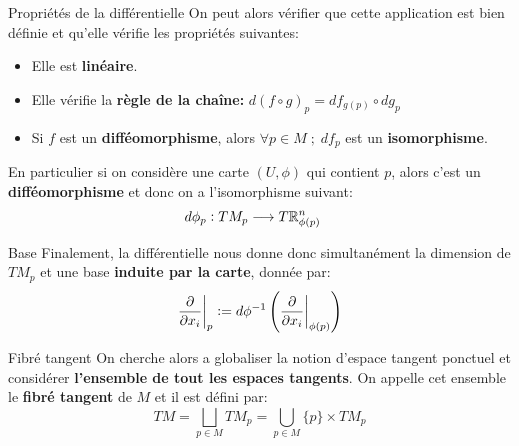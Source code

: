 \documentclass{beamer}
\begin{document}
        \begin{frame}{Propriétés de la différentielle}
            On peut alors vérifier que cette application est bien définie et qu'elle vérifie les propriétés suivantes:
            \begin{itemize}
               \item Elle est \textbf{linéaire}.
               \item Elle vérifie la \textbf{règle de la chaîne:} \( d(f \circ g)_p = df_{g(p)} \circ dg_p \)
               \item Si \( f \) est un \textbf{difféomorphisme}, alors \( \forall p \in M \; ; \; df_p \) est un \textbf{isomorphisme}.
            \end{itemize}
            En particulier si on considère une carte \( (U, \phi) \) qui contient \( p \), alors c'est un \textbf{difféomorphisme} et donc on a l'isomorphisme suivant:
            \[ 
               \begin{aligned}
                  d\phi_p : TM_p &\longrightarrow T\mathbb{R}_{\phi(p)}^n
               \end{aligned} 
            \]        
        \end{frame}
        \begin{frame}{Base}
            Finalement, la différentielle nous donne donc simultanément la dimension de $TM_p$ et une base \textbf{induite par la carte}, donnée par:
            \[
                \frac{\partial }{\partial x_i}\biggr|_p := d\phi^{-1}\left( \frac{\partial }{\partial x_i}\biggr|_{\phi(p)}\right) 
            \]
        \end{frame}
        \begin{frame}{Fibré tangent}
            On cherche alors a globaliser la notion d'espace tangent ponctuel et considérer \textbf{l'ensemble de tout les espaces tangents}. On appelle cet ensemble le \textbf{fibré tangent} de \( M \) et il est défini par:
            \[ 
                TM = \bigsqcup_{p \in M} TM_p = \bigcup_{p \in M} \{p\} \times TM_p
            \]
        \end{frame}         
\end{document}
